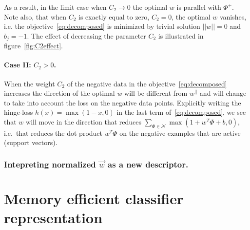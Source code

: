          As a result, in the limit case when $C_2 \rightarrow 0$ the optimal $w$ is parallel with $\Phi^+$. Note also, that when $C_2$ is exactly equal to zero, $C_2=0$, the optimal $w$ vanishes, i.e. the objective~\eqref{eq:decomposed} is minimized by trivial solution $||w||=0$ and $b_j=-1$. The effect of decreasing the parameter $C_2$ is illustrated in figure~\ref{fig:C2effect}.


      \paragraph{Case II: $C_2>0$.}
         When the weight $C_2$ of the negative data in the objective~\eqref{eq:decomposed} increases the direction of the optimal $w$ will be different from $w^{||}$ and will change to take into account the loss on the negative data points. Explicitly writing the hinge-loss $h(x) = \max(1-x,0)$ in the last term of~\eqref{eq:decomposed}, we see that $w$ will move in the direction that reduces $\sum_{\Phi\in \mathcal N}\max \left(1+w^T \Phi + b ,0 \right)$, i.e.\ that reduces the dot product $w^T \Phi$ on the negative examples that are active (support vectors).
         
         
         
         \subsubsection{Intepreting normalized $\vec{w}$ as a new descriptor.}


  \section{Memory efficient classifier representation}  
  \label{sec:memory}
  
